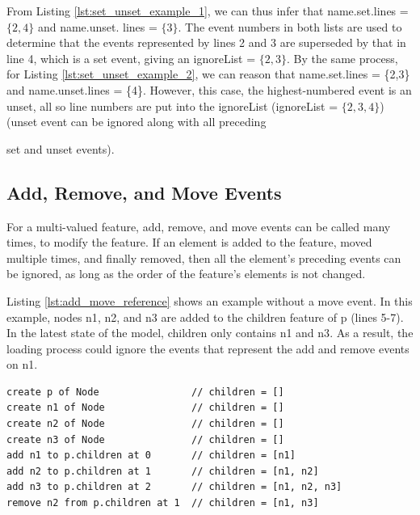 From Listing \ref{lst:set_unset_example_1}, we can thus infer that \textsf{name}.\textsf{set}.\textsf{lines} = $\{2,4\}$ and \textsf{name}.\textsf{unset}. \textsf{lines} = $\{3\}$. The event numbers in both lists are used to determine that the events represented by lines 2 and 3 are superseded by that in line 4, which is a \textsf{set} event, giving an \textsf{ignoreList} = $\{2, 3\}$.  By the same process, for Listing \ref{lst:set_unset_example_2}, we can reason that \textsf{name}.\textsf{set}.\textsf{lines} = \{2,3\} and \textsf{name}.\textsf{unset}.\textsf{lines} = \{4\}.  However, this case, the highest-numbered event is an \textsf{unset}, all so line numbers are put into the ignoreList (\textsf{ignoreList} = $\{2, 3, 4\}$) (\textsf{unset} event can be ignored along with all preceding {\textsf{set} and \textsf{unset} events). 

\subsection{Add, Remove, and Move Events}\label{subsec:add_remove_and_move_operations}
For a multi-valued feature, add, remove, and move events can be called many times, to modify the feature. If an element is added to the feature, moved multiple times, and finally removed, then all the element's preceding events can be ignored, as long as the order of the feature's elements is not changed. 

Listing \ref{lst:add_move_reference} shows an example without a \textsf{move} event. In this example, nodes \textsf{n1}, \textsf{n2}, and \textsf{n3} are added to the \textsf{children} feature of \textsf{p} (lines 5-7). In the latest state of the model, \textsf{children} only contains \textsf{n1} and \textsf{n3}. As a result, the loading process could ignore the events that represent the \textsf{add} and \textsf{remove} events on \textsf{n1}. 

\vspace{-20pt}
\begin{lstlisting}[style=eol,caption={A CBP of add and remove operations.},label=lst:add_move_reference]
create p of Node                // children = []
create n1 of Node               // children = []
create n2 of Node               // children = []
create n3 of Node               // children = []
add n1 to p.children at 0       // children = [n1]
add n2 to p.children at 1       // children = [n1, n2]
add n3 to p.children at 2       // children = [n1, n2, n3]
remove n2 from p.children at 1  // children = [n1, n3]   
\end{lstlisting}

}
